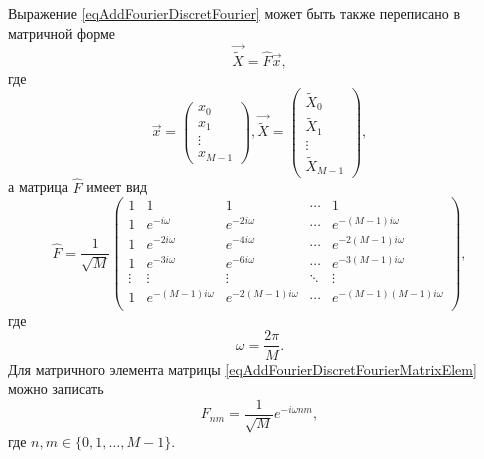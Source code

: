 Выражение \eqref{eqAddFourierDiscretFourier} может быть также
переписано в матричной форме
\begin{equation}
\vec{\tilde{X}} = \hat{F} \vec{x},
\nonumber
\end{equation}
где
\begin{equation}
\vec{x} = 
\left(
\begin{array}{c}
x_0 \\
x_1 \\
\vdots \\
x_{M-1}
\end{array}
\right)
,
\vec{\tilde{X}} = 
\left(
\begin{array}{c}
\tilde{X}_0 \\
\tilde{X}_1 \\
\vdots \\
\tilde{X}_{M-1}
\end{array}
\right)
,
\nonumber
\end{equation}
а матрица $\hat{F}$ имеет вид
\begin{equation}
\hat{F} = 
\frac{1}{\sqrt{M}}
\begin{pmatrix}
1 & 1 & 1 & \cdots & 1 \\
1 & e^{-i \omega} & e^{-2 i \omega} & \cdots & 
e^{-\left( M - 1 \right) i \omega} \\
1 & e^{-2 i \omega} & e^{-4 i \omega} & \cdots & 
e^{-2 \left( M - 1 \right) i \omega} \\
1 & e^{-3 i \omega} & e^{-6 i \omega} & \cdots & 
e^{-3 \left( M - 1 \right) i \omega} \\
\vdots & \vdots & \vdots & \ddots & \vdots \\
1 & e^{-\left( M - 1 \right) i \omega} & e^{-2\left( M - 1 \right) i \omega} & \cdots & 
e^{- \left( M - 1 \right)\left( M - 1 \right) i \omega} \\
\end{pmatrix}
,
\label{eqAddFourierDiscretFourierMatrixElem}
\end{equation}
где
\[
\omega = \frac{2 \pi}{M}.
\]
Для матричного элемента матрицы
\eqref{eqAddFourierDiscretFourierMatrixElem} можно записать
\begin{equation}
F_{n m} = \frac{1}{\sqrt{M}}e^{-i \omega n m},
\label{eqAddFourierDiscretFourierMatrixElem2}
\end{equation}
где $n, m \in \{ 0, 1, \dots, M - 1\}$.
